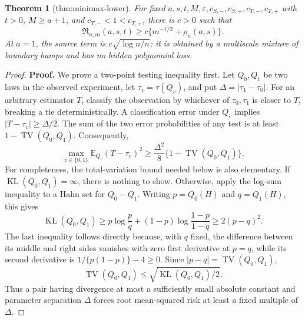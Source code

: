 \documentclass{article}
\newtheorem{theorem}{Theorem}
\begin{document}
\begin{theorem}[thm:minimax-lower]\label{thm:minimax-lower}
For fixed \(a,s,t,M,\varepsilon,c_{S,-},c_{S,+},c_{T,-},c_{T,+}\) with \(t>0\), \(M\ge a+1\), and \(c_{T,-}<1<c_{T,+}\), there is \(c>0\) such that \[\mathfrak R_{n,m}(a,s,t)\ge c\{m^{-1/2}+\rho_n(a,s)\}.\] At \(a=1\), the source term is \(c\sqrt{\log n/n}\); it is obtained by a multiscale mixture of boundary bumps and has no hidden polynomial loss.
\end{theorem}
\begin{proof}
\textbf{Proof.}
We prove a two-point testing inequality first.  Let \(Q_0,Q_1\) be two laws in the observed experiment, let \(\tau_v=\tau(Q_v)\), and put \(\Delta=|\tau_1-\tau_0|\).  For an arbitrary estimator \(T\), classify the observation by whichever of \(\tau_0,\tau_1\) is closer to \(T\), breaking a tie deterministically.  A classification error under \(Q_v\) implies \(|T-\tau_v|\geq \Delta/2\).  The sum of the two error probabilities of any test is at least \(1-\operatorname{TV}(Q_0,Q_1)\).  Consequently,
\[
 \max_{v\in\{0,1\}}\mathbb E_{Q_v}(T-\tau_v)^2
 \geq \frac{\Delta^2}{8}\{1-\operatorname{TV}(Q_0,Q_1)\}.
 \tag{14}
\]
For completeness, the total-variation bound needed below is also elementary.  If \(\operatorname{KL}(Q_0,Q_1)=\infty\), there is nothing to show.  Otherwise, apply the log-sum inequality to a Hahn set for \(Q_0-Q_1\).  Writing \(p=Q_0(H)\) and \(q=Q_1(H)\), this gives
\[
 \operatorname{KL}(Q_0,Q_1)
 \geq p\log\frac pq+(1-p)\log\frac{1-p}{1-q}
 \geq 2(p-q)^2.
 \tag{15}
\]
The last inequality follows directly because, with \(q\) fixed, the difference between its middle and right sides vanishes with zero first derivative at \(p=q\), while its second derivative is \(1/\{p(1-p)\}-4\geq0\).  Since \(|p-q|=\operatorname{TV}(Q_0,Q_1)\),
\[
 \operatorname{TV}(Q_0,Q_1)
 \leq \sqrt{\operatorname{KL}(Q_0,Q_1)/2}.
 \tag{16}
\]
Thus a pair having divergence at most a sufficiently small absolute constant and parameter separation \(\Delta\) forces root mean-squared risk at least a fixed multiple of \(\Delta\).


\end{proof}
\end{document}
